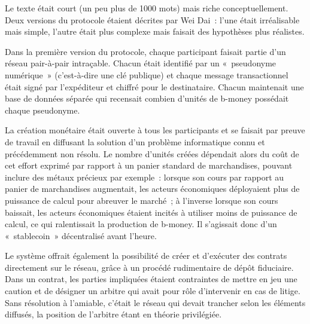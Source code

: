 Le texte était court (un peu plus de 1000 mots) mais riche conceptuellement. Deux versions du protocole étaient décrites par Wei Dai~: l'une était irréalisable mais simple, l'autre était plus complexe mais faisait des hypothèses plus réalistes.

Dans la première version du protocole, chaque participant faisait partie d'un réseau pair-à-pair intraçable. Chacun était identifié par un «~pseudonyme numérique~» (c'est-à-dire une clé publique) et chaque message transactionnel était signé par l'expéditeur et chiffré pour le destinataire. Chacun maintenait une base de données séparée qui recensait combien d'unités de b-money possédait chaque pseudonyme.

La création monétaire était ouverte à tous les participants et se faisait par preuve de travail en diffusant la solution d'un problème informatique connu et précédemment non résolu. Le nombre d'unités créées dépendait alors du coût de cet effort exprimé par rapport à un panier standard de marchandises, pouvant inclure des métaux précieux par exemple~: lorsque son cours par rapport au panier de marchandises augmentait, les acteurs économiques déployaient plus de puissance de calcul pour abreuver le marché~; à l'inverse lorsque son cours baissait, les acteurs économiques étaient incités à utiliser moins de puissance de calcul, ce qui ralentissait la production de b-money. Il s'agissait donc d'un «~stablecoin~» décentralisé avant l'heure. %

Le système offrait également la possibilité de créer et d'exécuter des contrats directement sur le réseau, grâce à un procédé rudimentaire de dépôt fiduciaire. Dans un contrat, les parties impliquées étaient contraintes de mettre en jeu une caution et de désigner un arbitre qui avait pour rôle d'intervenir en cas de litige. Sans résolution à l'amiable, c'était le réseau qui devait trancher selon les éléments diffusés, la position de l'arbitre étant en théorie privilégiée.

